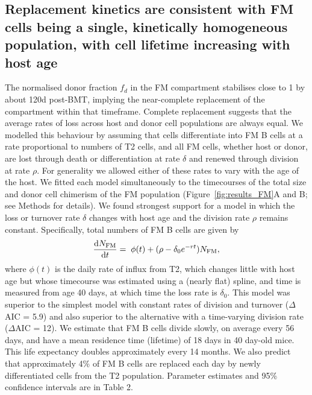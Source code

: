 \documentclass[11pt]{article}
\newcommand{\ddt}[1]{\ensuremath{\frac{{\rm d}#1}{{\rm d}t}}}  %
\newcommand{\red}[1]{{\color{red}{#1}}}
\newcommand{\be}{\begin{equation}}
\newcommand{\ee}{\end{equation}}
\begin{document}
\subsection*{Replacement kinetics are consistent with FM cells being a single, kinetically homogeneous population, with cell lifetime increasing with host age}
The normalised donor fraction $f_{d}$ in the FM compartment stabilises close to 1 by about 120d post-BMT, implying the near-complete replacement of the compartment within that timeframe. Complete replacement suggests that the average rates of loss across host and donor cell populations are always equal.
We modelled this behaviour by assuming that cells differentiate into FM B cells at a rate proportional to numbers of T2 cells, and all FM cells, whether host or donor, are lost through death or differentiation  at rate $\delta$ and renewed through division  at rate $\rho$. For generality we allowed either of these rates to vary with the age of the host. We fitted each model  simultaneously to the timecourses of the total size and donor cell chimerism of the FM population (Figure~\ref{fig:results_FM}A and B; see Methods for details). We found strongest support for a model in which the loss or turnover rate $\delta$ changes with host age and the division rate $\rho$ remains constant. Specifically, total numbers of FM B cells are given by
\be
\ddt{N_\text{FM}} = \;  \phi(t) + (\rho - \delta_{0}e^{-rt}) N_\text{FM},
\label{eq:FM_total}
\ee
where $\phi(t)$ is the daily rate of influx from T2, which changes little with host age but whose timecourse was estimated using a (nearly flat) spline, and time is measured from age 40 days, at which time the loss rate is $\delta_{0}$. This model was superior to the simplest model with constant rates of division and turnover ($\Delta$AIC = 5.9) and also superior to the alternative with a time-varying division rate ($\Delta$AIC = 12). We estimate that FM B cells divide slowly, on average every 56 days,  and have a mean residence time (lifetime) of 18 days in 40 day-old mice. This life expectancy doubles approximately every 14 months. We also predict that approximately 4\% of FM B cells are replaced each day by newly differentiated cells from the T2 population. Parameter estimates and 95\% confidence intervals are in Table 2.
\red{We also define the net loss rate $\lambda$ as the aggregate of cell division and turnover (i.e. $\delta - \rho$), which decreases with time for FM cells, as $\delta$ declines.
	Therefore, in old animals individual FM clones and their progeny would persist longer in follicles than in younger animals, purely due to age-mediated changes in the host environment.}
\end{document}
